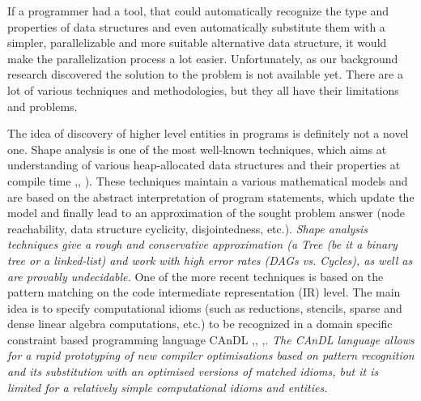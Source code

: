 \begin{description}[style=unboxed,leftmargin=0cm]
If a programmer had a tool, that could automatically recognize the type and properties of data structures and even automatically substitute them with a simpler, parallelizable and more suitable alternative data structure, it would make the parallelization process a lot easier. Unfortunately, as our background research discovered the solution to the problem is not available yet. There are a lot of various techniques and methodologies, but they all have their limitations and problems.
\item[Background work] The idea of discovery of higher level entities in programs is definitely not a novel one. Shape analysis is one of the most well-known techniques, which aims at understanding of various heap-allocated data structures and their properties at compile time \cite{Sagiv:1999:PSA:292540.292552},\cite{Wilhelm:2000:SA:647476.760384}, \cite{Ghiya:1996:TDC:237721.237724}). These techniques maintain a various mathematical models and are based on the abstract interpretation of program statements, which update the model and finally lead to an approximation of the sought problem answer (node reachability, data structure cyclicity, disjointedness, etc.). \textit{Shape analysis techniques give a rough and conservative approximation (a \textit{Tree} (be it a binary tree or a linked-list) and work with high error rates (\textit{DAGs} vs. \textit{Cycles}), as well as are provably undecidable.} One of the more recent techniques is based on the pattern matching on the code intermediate representation (IR) level. The main idea is to specify computational idioms (such as reductions, stencils, sparse and dense linear algebra computations, etc.) to be recognized in a domain specific constraint based programming language CAnDL \cite{Ginsbach:2018:CDS:3178372.3179515},\cite{Ginsbach:2017:DEG:3049832.3049862}, \cite{Ginsbach:2018:AML:3296957.3173182},\cite{Ginsbach:2018:AML:3296957.3173182}. \textit{The CAnDL language allows for a rapid prototyping of new compiler optimisations based on pattern recognition and its substitution with an optimised versions of matched idioms, but it is limited for a relatively simple computational idioms and entities.} 

\end{description}
